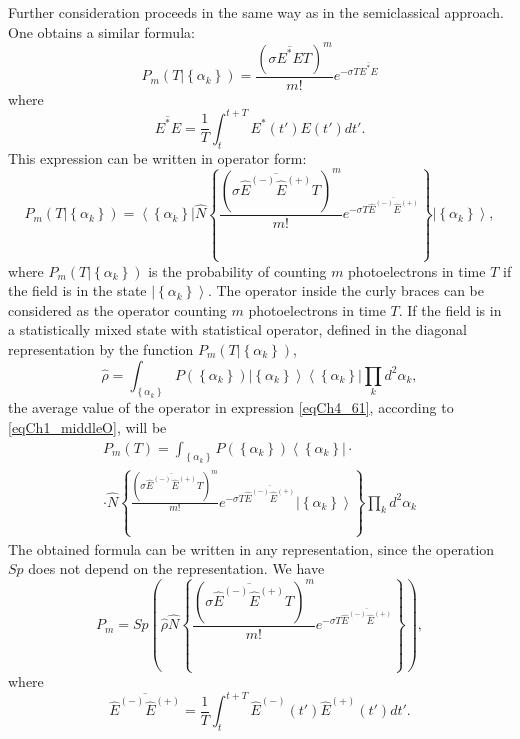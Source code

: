 Further consideration proceeds in the same way as in
the semiclassical approach. One obtains a similar formula:
\begin{equation}
P_m\left(\left.T\right|\left\{\alpha_k\right\}\right) = 
\frac{\left(\sigma \overline{E^\ast E} T\right)^m}{m!}
e^{- \sigma T \overline{E^\ast E}}
\label{eqCh4_60}
\end{equation}
where
\[
\overline{E^\ast E} = \frac{1}{T} \int_t^{t + T}E^\ast\left(t'\right)
E\left(t'\right)dt'.
\]
This expression can be written in operator form:
\begin{equation}
P_m\left(\left.T\right|\left\{\alpha_k\right\}\right) = 
\left<\left\{\alpha_k\right\}\right|
\hat{N}
\left\{
\frac{\left(\sigma \overline{\hat{E}^{(-)} \hat{E}^{(+)}} T\right)^m}{m!}
e^{- \sigma T \overline{\hat{E}^{(-)} \hat{E}^{(+)}}}
\right\}
\left|\left\{\alpha_k\right\}\right>,
\label{eqCh4_61}
\end{equation}
where $P_m\left(\left.T\right|\left\{\alpha_k\right\}\right)$ is the probability of counting $m$ photoelectrons in time $T$ if the field
is in the state $\left|\left\{\alpha_k\right\}\right>$.
The operator inside the curly braces can  
be considered as the operator counting $m$ photoelectrons in time $T$. If
the field is in a statistically mixed state with statistical
operator, defined in the diagonal representation by the function 
$P_m\left(\left.T\right|\left\{\alpha_k\right\}\right)$,
\[
\hat{\rho} = \int_{\left\{\alpha_k\right\}}
P\left(\left\{\alpha_k\right\}\right)
\left|\left\{\alpha_k\right\}\right>
\left<\left\{\alpha_k\right\}\right|
\prod_k d^2\alpha_k,
\]
the average value of the operator in expression \eqref{eqCh4_61},
according to \eqref{eqCh1_middleO}, will be 
\begin{eqnarray}
P_m\left(T\right) =
\int_{\left\{\alpha_k\right\}}
P\left(\left\{\alpha_k\right\}\right)
\left<\left\{\alpha_k\right\}\right|
\cdot
\nonumber \\
\cdot 
\hat{N}
\left\{
\frac{\left(\sigma \overline{\hat{E}^{(-)} \hat{E}^{(+)}} T\right)^m}{m!}
e^{- \sigma T \overline{\hat{E}^{(-)} \hat{E}^{(+)}}}
\left|\left\{\alpha_k\right\}\right>
\right\}
\prod_k d^2\alpha_k
\label{eqCh4_62}
\end{eqnarray}
The obtained formula can be written in any representation, since the operation $Sp$ does not depend on the representation. We have
\begin{equation}
P_m = Sp\left(
\hat{\rho}
\hat{N}
\left\{
\frac{\left(\sigma \overline{\hat{E}^{(-)} \hat{E}^{(+)}} T\right)^m}{m!}
e^{- \sigma T \overline{\hat{E}^{(-)} \hat{E}^{(+)}}}
\right\}
\right),
\label{eqCh4_63}
\end{equation}
where
\[
\overline{\hat{E}^{(-)} \hat{E}^{(+)}} = \frac{1}{T} \int_t^{t + T}\hat{E}^{(-)}\left(t'\right)
\hat{E}^{(+)}\left(t'\right)dt'.
\]

